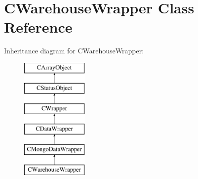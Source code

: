 \hypertarget{class_c_warehouse_wrapper}{\section{C\-Warehouse\-Wrapper Class Reference}
\label{class_c_warehouse_wrapper}
}
Inheritance diagram for C\-Warehouse\-Wrapper\-:\begin{figure}[H]
\begin{center}
\leavevmode
\includegraphics[height=6.000000cm]{class_c_warehouse_wrapper}
\end{center}
\end{figure}
